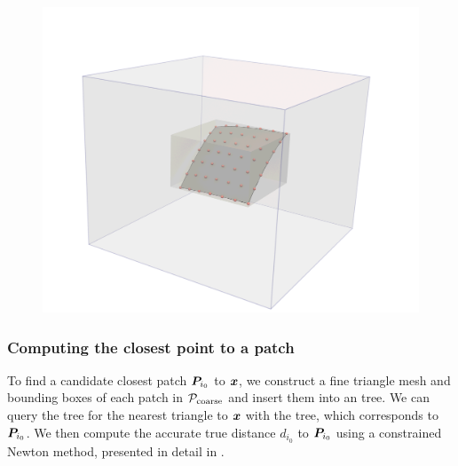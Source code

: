 \begin{figure}[!htb]
\begin{minipage}{.33\textwidth}
  \end{minipage}\hfill
  \begin{minipage}{.33\textwidth}
    \includegraphics[width=\linewidth]{figs/patch_with_coeffs_near_bbox.png}
  \end{minipage}\hfill
\end{figure}



\subsubsection{Computing the closest point to a patch\label{sec:closest_point_algo}}

To find a candidate closest patch ${\bm{P}}_{i_0}$ to ${\bm{x}}$, we construct a fine triangle mesh and bounding boxes of each patch in ${\mathcal{P}_{\mathrm{coarse}}}$ and insert them into an \aabb tree.
We can query the \aabb tree for the nearest triangle to ${\bm{x}}$ with the \aabb tree, which corresponds to ${\bm{P}}_{i_0}$.
We then compute the accurate true distance $d_{i_0}$ to ${\bm{P}}_{i_0}$ using a constrained Newton method, presented in detail in \cite[Section 2]{morse2020bsupplementary}.

